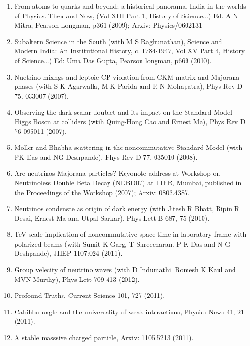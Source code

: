 \begin{enumerate}
\item From atoms to quarks and beyond: a historical panorama, India in the worlds of Physics: Then and Now, (Vol XIII Part 1, History of Science...) Ed: A N Mitra, Pearson Longman, p361 (2009); Arxiv: Physics/0602131.

\item Subaltern Science in the South (with M S Raghunathan), Science and Modern India: An Institutional History, c. 1784-1947, Vol XV Part 4, History of Science...) Ed: Uma Das Gupta, Pearson longman, p669 (2010).

\item Nuetrino mixngs and leptoic CP violation from CKM matrix and Majorana phases (with S K Agarwalla, M K Parida and R N Mohapatra), Phys Rev D 75, 033007 (2007).

\item Observing the dark scalar doublet and its impact on the Standard Model Higgs Boson at colliders (wtih Quing-Hong Cao and Ernest Ma), Phys Rev D 76 095011 (2007).

\item Moller and Bhabha scattering in the noncommutative Standard Model (with PK Das and NG Deshpande), Phys Rev D 77, 035010 (2008).

\item Are neutrinos Majorana particles?  Keyonote address at Workshop on Neutrinoless Double Beta Decay (NDBD07) at TIFR, Mumbai, published in the Proceedings of the Workshop (2007); Arxiv: 0803.4387.

\item Neutrinos condenste as origin of dark energy (with Jitesh R Bhatt, Bipin R Desai, Ernest Ma and Utpal Sarkar), Phys Lett B 687, 75 (2010).

\item TeV scale implication of noncommutative space-time in laboratory frame with polarized beams (with Sumit K Garg, T Shreecharan, P K Das and N G Deshpande), JHEP 1107:024 (2011).

\item Group velecity of neutrino waves (with D Indumathi, Romesh K Kaul and MVN Murthy), Phys Lett 709 413 (2012).

\item Profound Truths, Current Science 101, 727 (2011).

\item Cabibbo angle and the universality of weak interactions, Physics News 41, 21 (2011).

\item A stable masssive charged particle, Arxiv: 1105.5213 (2011).


\end{enumerate}
